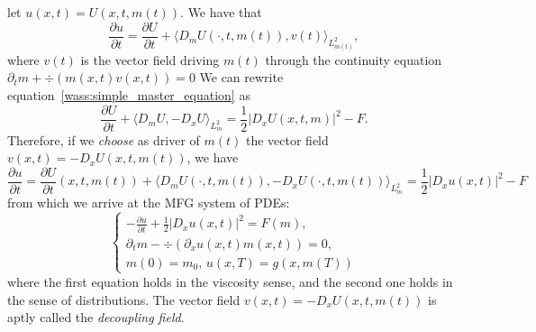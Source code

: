   let $u(x,t) = U(x,t,m(t))$. We have that
\begin{equation}
    \frac{\partial u}{\partial t} = \frac{\partial U}{\partial t} + \langle D_m U (\cdot, t, m(t)), v(t) \rangle_{L^2_{m(t)}},
\end{equation}
    where $v(t)$ is the vector field driving $m(t)$ through the continuity equation $\partial_t m + \div( m(x,t) v(x,t) ) = 0$
    We can rewrite equation~\eqref{wass:simple_master_equation} as 
\begin{equation}
    \frac{\partial U}{ \partial t} + \langle D_m U, - D_x U \rangle_{L^2_m} = \frac{1}{2} |D_x U(x,t,m)|^2 - F.
\end{equation}
    Therefore, if we \textit{choose} as driver of $m(t)$ the vector field $v(x,t) = - D_x U(x,t,m(t))$,
    we have
\begin{equation}
    \frac{\partial u}{\partial t} =  \frac{\partial U}{ \partial t}(x,t,m(t)) + \langle D_m U(\cdot, t, m(t) ), - D_x U(\cdot, t, m(t) ) \rangle_{L^2_m} = \frac{1}{2} |D_x u(x,t)|^2 - F
\end{equation}
    from which we arrive at the MFG system of PDEs:
\begin{equation}
    \begin{cases}
        - \frac{\partial u}{\partial t} + \frac{1}{2} |D_x u(x,t)|^2  = F(m), \\
        \partial_t m - \div( \partial_x u(x,t) m(x,t) ) = 0,\\
        m(0) = m_0, \, u(x,T) = g(x, m(T))
    \end{cases}
\end{equation}
    where the first equation holds in the viscosity sense, and the second
    one holds in the sense of distributions.
    The vector field $v(x,t) = -D_x U(x,t,m(t))$ is aptly called the \textit{decoupling field}.